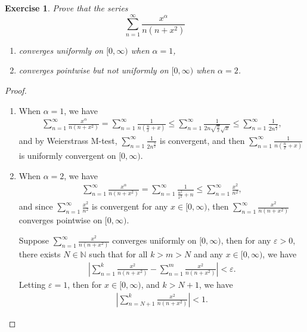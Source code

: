 \documentclass[11pt]{article}
\newtheorem{exercise}{Exercise}[section]
\theoremstyle{definition}
\numberwithin{equation}{subsection}
\begin{document}
\begin{exercise}
Prove that the series $$\sum^\infty_{n=1} \frac{x^\alpha}{n(n + x^2)}$$
\begin{enumerate}[label=(\alph*)]
    \item converges uniformly on $[0,\infty)$ when $\alpha = 1$,
    
    \item converges pointwise but not uniformly on $[0, \infty)$ when $\alpha = 2$.{\rm *}
    \end{enumerate}
\end{exercise}
\begin{proof}
~\begin{enumerate}[label=(\alph*)]
    \item When $\alpha = 1$, we have
    \begin{align*}
        \sum^\infty_{n=1} \frac{x^\alpha}{n(n + x^2)} = \sum^\infty_{n=1} \frac{1}{n(\frac{n}{x} + x)} \leq \sum^\infty_{n=1} \frac{1}{2n \sqrt{\frac{n}{x}} \sqrt{x}} \leq \sum^\infty_{n=1} \frac{1}{2n^{\frac{3}{2}}},
    \end{align*}
    and by Weierstrass M-test, $\displaystyle \sum^\infty_{n=1} \frac{1}{2n^{\frac{3}{2}}}$ is convergent, and then $\displaystyle \sum^\infty_{n=1} \frac{1}{n(\frac{n}{x} + x)}$ is uniformly convergent on $[0,\infty)$. 
    
    \item When $\alpha = 2$, we have
    \begin{align*}
        \sum^\infty_{n=1} \frac{x^\alpha}{n(n + x^2)} = \sum^\infty_{n=1} \frac{1}{\frac{n^2}{x^2} + n} \leq \sum^\infty_{n=1} \frac{x^2}{n^2},
    \end{align*}
    and since $\displaystyle \sum^\infty_{n=1} \frac{x^2}{n^2}$ is convergent for any $x \in [0,\infty)$, then $\displaystyle \sum^\infty_{n=1} \frac{x^2}{n(n + x^2)}$ converges pointwise on $[0,\infty)$.
    
    Suppose $\displaystyle \sum^\infty_{n=1} \frac{x^2}{n(n + x^2)}$ converges uniformly on $[0,\infty)$, then for any $\varepsilon > 0$, there exists $N \in \mathbb{N}$ such that for all $k >m > N$ and any $x \in [0,\infty)$, we have
    \begin{align*}
        \left|\sum^k_{n=1} \frac{x^2}{n(n + x^2)} - \sum^m_{n=1} \frac{x^2}{n(n + x^2)} \right| < \varepsilon.
    \end{align*}
    Letting $\varepsilon = 1$, then for $x \in [0,\infty)$, and $k > N + 1$, we have
    \begin{align*}
        \left|\sum^k_{n=N+1} \frac{x^2}{n(n + x^2)} \right| < 1.
    \end{align*}
    

\end{enumerate}
\end{proof}
\end{document}

